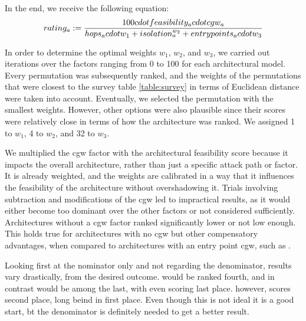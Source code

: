 In the end, we receive the following equation:\\
\begin{equation}
    rating_{a} := \frac{100 cdot  feasibility_{a} cdot  cgw_{a}}{hops_{a}cdot w_{1} + isolation_{a}^{w_{2}} + entrypoints_{a}cdot w_{3}} \label{eq:rating}\\\\
\end{equation}

\hfill \break

In order to determine the optimal weights $w_{1}$, $w_{2}$, and $w_{3}$, we carried out iterations over the factors ranging from 0 to 100 for each architectural model. 
Every permutation was subsequently ranked, and the weights of the permutations that were closest to the survey table \ref{table:survey} in terms of Euclidean distance were taken into account. 
Eventually, we selected the permutation with the smallest weights. However, other options were also plausible since their scores were relatively close in terms of how the architecture was ranked. 
We assigned 1 to $w_{1}$, 4 to $w_{2}$, and 32 to $w_{3}$.

We multiplied the \acrshort{cgw} factor with the architectural feasibility score because it impacts the overall architecture, rather than just a specific attack path or factor. 
It is already weighted, and the weights are calibrated in a way that it influences the feasibility of the architecture without overshadowing it. 
Trials involving subtraction and modifications of the \acrshort{cgw} led to impractical results, as it would either become too dominant over the other factors or not considered sufficiently. 
Architectures without a \acrshort{cgw} factor ranked significantly lower or not low enough. 
This holds true for architectures with no \acrshort{cgw} but other compensatory advantages, when compared to architectures with an entry point \acrshort{cgw}, such as .

Looking first at the nominator only and not regarding the denominator, results vary drastically, from the desired outcome.
 would be ranked fourth, and in contrast  would be among the last,
with  even scoring last place.
 however, scores second place, long beind  in first place.
Even though this is not ideal it is a good start, bt the denominator is definitely needed to get a better result.

